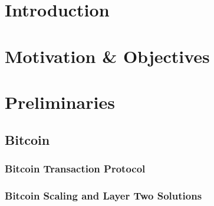 \documentclass[draft,final]{vutinfth} %
\begin{document}
\frontmatter %

\addstatementpage


\begin{acknowledgements*}
\end{acknowledgements*}


\begin{abstract}
\end{abstract}


\tableofcontents %

\mainmatter

\chapter{Introduction}

\chapter{Motivation \& Objectives}

\chapter{Preliminaries}
\section{Bitcoin}
\subsection{Bitcoin Transaction Protocol}
\subsection{Bitcoin Scaling and Layer Two Solutions}
\end{document}

